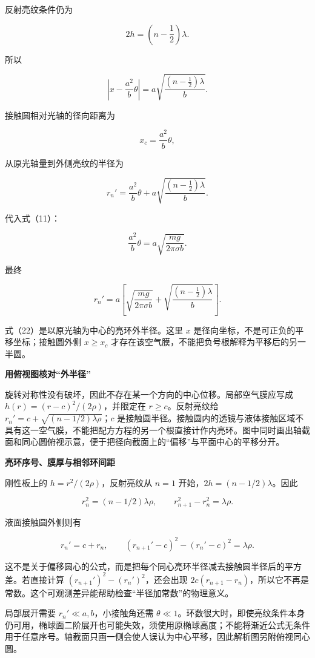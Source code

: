 \documentclass[12pt,a4paper,UTF8]{ctexart}
\begin{document}
反射亮纹条件仍为

\[
2h=\left(n-\frac12\right)\lambda.
\]

所以

\[
\left|
x-\frac{a^2}{b}\theta
\right|
=a\sqrt{\frac{(n-\frac12)\lambda}{b}}.
\tag{20}
\]

接触圆相对光轴的径向距离为

\[
x_c=\frac{a^2}{b}\theta,
\]

从原光轴量到外侧亮纹的半径为

\[
r_n'
=\frac{a^2}{b}\theta
+a\sqrt{\frac{(n-\frac12)\lambda}{b}}.
\tag{21}
\]

代入式（11）：

\[
\frac{a^2}{b}\theta
=a\sqrt{\frac{mg}{2\pi\sigma b}}.
\]

最终

\[
\boxed{
r_n'
=a\left[
\sqrt{\frac{mg}{2\pi\sigma b}}
+\sqrt{\frac{(n-\frac12)\lambda}{b}}
\right]
}.
\tag{22}
\]

式（22）是以原光轴为中心的亮环外半径。这里 \(x\)
是径向坐标，不是可正负的平移坐标；接触圆外侧 \(x\ge x_c\)
才存在该空气膜，不能把负号根解释为平移后的另一半圆。

\textbf{用俯视图核对``外半径''}

旋转对称性没有破坏，因此不存在某一个方向的中心位移。局部空气膜应写成
\(h(r)=(r-c)^2/(2\rho)\)，并限定在 \(r\ge c\)。反射亮纹给
\(r_n'=c+\sqrt{(n-1/2)\lambda\rho}\)；\(c\)
是接触圆半径。接触圆内的透镜与液体接触区域不具有这一空气膜，不能把配方方程的另一个根直接计作内亮环。图中同时画出轴截面和同心圆俯视示意，便于把径向截面上的``偏移''与平面中心的平移分开。

\textbf{亮环序号、膜厚与相邻环间距}

刚性板上的 \(h=r^2/(2\rho)\)，反射亮纹从 \(n=1\)
开始，\(2h=(n-1/2)\lambda\)。因此

\[r_n^2=(n-1/2)\lambda\rho,\qquad r_{n+1}^2-r_n^2=\lambda\rho.\]

液面接触圆外侧则有

\[r_n'=c+r_n,\qquad (r_{n+1}'-c)^2-(r_n'-c)^2=\lambda\rho.\]

这不是关于偏移圆心的公式，而是把每个同心亮环半径减去接触圆半径后的平方差。若直接计算
\((r_{n+1}')^2-(r_n')^2\)，还会出现
\(2c(r_{n+1}-r_n)\)，所以它不再是常数。这个可观测差异能帮助检查``半径加常数''的物理意义。

局部展开需要 \(r_n'\ll a,b\)，小接触角还需
\(\theta\ll1\)。环数很大时，即使亮纹条件本身仍可用，椭球面二阶展开也可能失效，须使用原椭球高度；不能将渐近公式无条件用于任意序号。轴截面只画一侧会使人误认为中心平移，因此解析图另附俯视同心圆。
\end{document}
